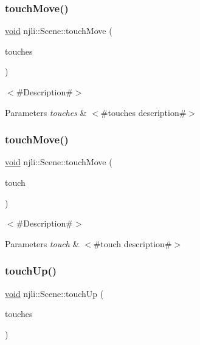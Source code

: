 \subsubsection{\texorpdfstring{touch\+Move()}{touchMove()}\hspace{0.1cm}{\footnotesize\ttfamily [1/2]}}
{\footnotesize\ttfamily \mbox{\hyperlink{_thread_8h_af1e856da2e658414cb2456cb6f7ebc66}{void}} njli\+::\+Scene\+::touch\+Move (\begin{DoxyParamCaption}\item[{\mbox{\hyperlink{classnjli_1_1_device_touch}{Device\+Touch}} $\ast$$\ast$}]{touches }\end{DoxyParamCaption})}

$<$\#\+Description\#$>$


\begin{DoxyParams}{Parameters}
{\em touches} & $<$\#touches description\#$>$ \\
\hline
\end{DoxyParams}
\mbox{\label{classnjli_1_1_scene_a4861fe63ac950cec785a15fd8d778edc}} 
\subsubsection{\texorpdfstring{touch\+Move()}{touchMove()}\hspace{0.1cm}{\footnotesize\ttfamily [2/2]}}
{\footnotesize\ttfamily \mbox{\hyperlink{_thread_8h_af1e856da2e658414cb2456cb6f7ebc66}{void}} njli\+::\+Scene\+::touch\+Move (\begin{DoxyParamCaption}\item[{const \mbox{\hyperlink{classnjli_1_1_device_touch}{Device\+Touch}} \&}]{touch }\end{DoxyParamCaption})}

$<$\#\+Description\#$>$


\begin{DoxyParams}{Parameters}
{\em touch} & $<$\#touch description\#$>$ \\
\hline
\end{DoxyParams}
\mbox{\label{classnjli_1_1_scene_a292488e27e7feeccb28d36f827cff719}} 
\subsubsection{\texorpdfstring{touch\+Up()}{touchUp()}\hspace{0.1cm}{\footnotesize\ttfamily [1/2]}}
{\footnotesize\ttfamily \mbox{\hyperlink{_thread_8h_af1e856da2e658414cb2456cb6f7ebc66}{void}} njli\+::\+Scene\+::touch\+Up (\begin{DoxyParamCaption}\item[{\mbox{\hyperlink{classnjli_1_1_device_touch}{Device\+Touch}} $\ast$$\ast$}]{touches }\end{DoxyParamCaption})}

